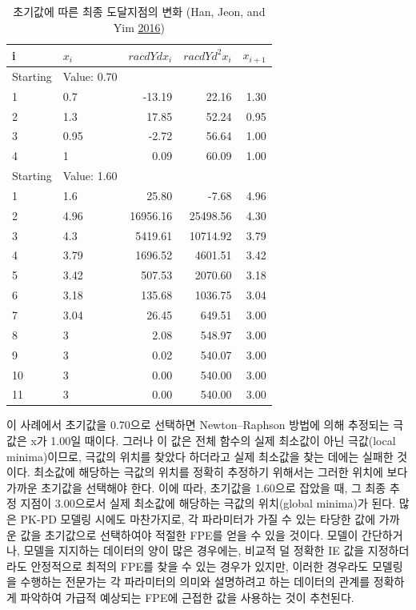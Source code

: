 \documentclass[
  10pt,
  krantz2,
  a4paper]{krantz}
\theoremstyle{definition}
\theoremstyle{definition}
\theoremstyle{definition}
\theoremstyle{remark}
\begin{document}
\begin{table}

\caption{\label{tab:final-destination}초기값에 따른 최종 도달지점의 변화 (Han, Jeon, and Yim \protect\hyperlink{ref-han2016tips}{2016})}
\centering
\begin{tabular}[t]{l|l|r|r|r}
\hline
i & $x_i$ & $rac{dY}{dx_i}$ & $rac{dY}{d^2x_i}$ & $x_{i+1}$\\
\hline
Starting & Value: 0.70 &  &  & \\
\hline
1 & 0.7 & -13.19 & 22.16 & 1.30\\
\hline
2 & 1.3 & 17.85 & 52.24 & 0.95\\
\hline
3 & 0.95 & -2.72 & 56.64 & 1.00\\
\hline
4 & 1 & 0.09 & 60.09 & 1.00\\
\hline
Starting & Value: 1.60 &  &  & \\
\hline
1 & 1.6 & 25.80 & -7.68 & 4.96\\
\hline
2 & 4.96 & 16956.16 & 25498.56 & 4.30\\
\hline
3 & 4.3 & 5419.61 & 10714.92 & 3.79\\
\hline
4 & 3.79 & 1696.52 & 4601.51 & 3.42\\
\hline
5 & 3.42 & 507.53 & 2070.60 & 3.18\\
\hline
6 & 3.18 & 135.68 & 1036.75 & 3.04\\
\hline
7 & 3.04 & 26.45 & 649.51 & 3.00\\
\hline
8 & 3 & 2.08 & 548.97 & 3.00\\
\hline
9 & 3 & 0.02 & 540.07 & 3.00\\
\hline
10 & 3 & 0.00 & 540.00 & 3.00\\
\hline
11 & 3 & 0.00 & 540.00 & 3.00\\
\hline
\end{tabular}
\end{table}



이 사례에서 초기값을 0.70으로 선택하면 Newton--Raphson 방법에 의해 추정되는 극값은 x가 1.00일 때이다. 그러나 이 값은 전체 함수의 실제 최소값이 아닌 극값(local minima)이므로, 극값의 위치를 찾았다 하더라고 실제 최소값을 찾는 데에는 실패한 것이다. 최소값에 해당하는 극값의 위치를 정확히 추정하기 위해서는 그러한 위치에 보다 가까운 초기값을 선택해야 한다. 이에 따라, 초기값을 1.60으로 잡았을 때, 그 최종 추정 지점이 3.00으로서 실제 최소값에 해당하는 극값의 위치(global minima)가 된다. 많은 PK-PD 모델링 시에도 마찬가지로, 각 파라미터가 가질 수 있는 타당한 값에 가까운 값을 초기값으로 선택하여야 적절한 FPE를 얻을 수 있을 것이다. 모델이 간단하거나, 모델을 지지하는 데이터의 양이 많은 경우에는, 비교적 덜 정확한 IE 값을 지정하더라도 안정적으로 최적의 FPE를 찾을 수 있는 경우가 있지만, 이러한 경우라도 모델링을 수행하는 전문가는 각 파라미터의 의미와 설명하려고 하는 데이터의 관계를 정확하게 파악하여 가급적 예상되는 FPE에 근접한 값을 사용하는 것이 추천된다.
\end{document}
